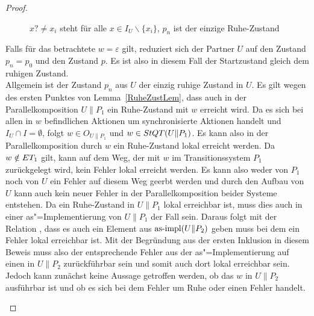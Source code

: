 \begin{proof}
\begin{figure} [h!tbp]
\begin{center}
    \caption{$x?\neq x_i$ steht für alle $x\in I_U\backslash\{x_i\}$, $p_n$
    ist der einzige Ruhe-Zustand}
  \label{UohneEmitI}
  \end{center}
  \end{figure}
  Falls für das betrachtete $w=\varepsilon$ gilt, reduziert sich der Partner
  $U$ auf den Zustand $p_n=p_0$ und den Zustand $p$. Es ist also in diesem Fall
  der Startzustand gleich dem ruhigen Zustand.\\
  Allgemein ist der Zustand $p_n$ aus $U$ der einzig ruhige Zustand in $U$. Es
  gilt wegen des ersten Punktes von Lemma~\ref{RuheZustLem}, dass auch in der
  Parallelkomposition $U\|P_1$ ein Ruhe-Zustand mit $w$ erreicht wird. Da es
  sich bei allen in $w$ befindlichen Aktionen um synchronisierte Aktionen
  handelt und $I_U\cap I=\emptyset$, folgt $w\in O_{U\|P_1}$ und $w\in StQT
  (U\|P_1)$. Es kann also in der Parallelkomposition durch $w$ ein Ruhe-Zustand
  lokal erreicht werden. Da $w\notin ET _1$ gilt, kann auf dem Weg, der mit $w$
  im Transitionssystem $P_1$ zurückgelegt wird, kein Fehler
  lokal erreicht werden. Es kann also weder von $P_1$ noch von $U$ ein
  Fehler auf diesem Weg geerbt werden und durch den Aufbau von
  $U$ kann auch kein neuer Fehler in der Parallelkomposition
  beider Systeme entstehen. Da ein Ruhe-Zustand in $U\|P_1$ lokal erreichbar
  ist, muss dies auch in einer as"=Implementierung von $U\|P_1$ der Fall sein.
  Daraus folgt mit der Relation \QBRel{}, dass es auch ein Element aus $\mathrm{as}\text{-}\mathrm{impl}
  (U\|P_2)$ geben muss bei dem ein Fehler lokal erreichbar ist. Mit der
  Begründung aus der ersten Inklusion in diesem Beweis muss also der
  entsprechende Fehler aus der as"=Implementierung auf einen in $U\|P_2$
  zurückführbar sein und somit auch dort lokal erreichbar sein. Jedoch kann
  zunächst keine Aussage getroffen werden, ob das $w$ in $U\|P_2$ ausführbar
  ist und ob es sich bei dem Fehler um Ruhe oder einen Fehler
  handelt.
  \begin{itemize}

\end{itemize}
\end{proof}
